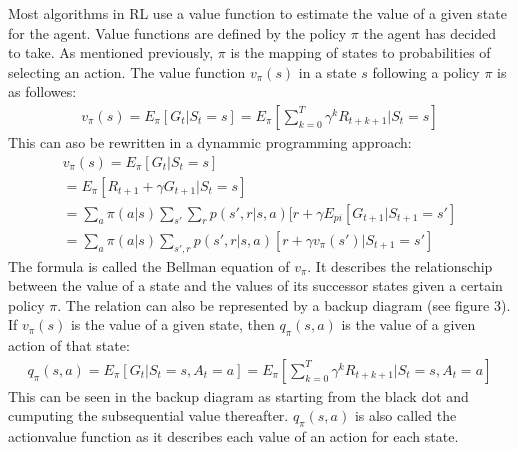 \documentclass[letterpaper,10pt,english]{jupyterBook}
\begin{document}
\sphinxAtStartPar
Most algorithms in RL use a value function to estimate the value of a given state for the agent. Value functions are defined by the policy \(\pi\) the agent has decided to take. As mentioned previously, \(\pi\) is the mapping of states to probabilities of selecting an action. The value function \(v_{\pi}(s)\) in a state \(s\) following a policy \(\pi\) is as followes:
\begin{equation*}
\begin{split} v_{\pi}(s) = E_{\pi}[G_t | S_t = s] = E_{\pi}[\sum_{k=0}^T \gamma^kR_{t+k+1} | S_t=s] \end{split}
\end{equation*}
\sphinxAtStartPar
This can aso be rewritten in a dynammic programming approach:
\begin{equation}\label{equation:Reinforcement_learning:my_label}
\begin{split}v_{\pi}(s) = E_{\pi}[G_t | S_t = s] \\
= E_{\pi}[R_{t+1} + \gamma G_{t+1} | S_t = s] \\
= \sum_a \pi(a|s) \sum_{s'} \sum_r p(s', r|s,a)[r + \gamma E_{pi}[G_{t+1} | S_{t+1} = s'] \\
= \sum_a \pi(a|s) \sum_{s', r}p(s', r|s,a)[r + \gamma v_{\pi}(s')| S_{t+1} = s'] \end{split}
\end{equation}
\sphinxAtStartPar
The formula is called the Bellman equation of \(v_{\pi}\). It describes the relationschip between the value of a state and the values of its successor states given a certain policy \(\pi\). The relation can also be represented by a backup diagram (see figure 3). If \(v_{\pi}(s)\) is the value of a given state, then \(q_{\pi}(s,a)\) is the value of a given action of that state:
\begin{equation*}
\begin{split} q_{\pi}(s,a) = E_{\pi}[G_t | S_t = s, A_t = a] = E_{\pi}[\sum_{k=0}^T \gamma^kR_{t+k+1} | S_t=s, A_t = a] \end{split}
\end{equation*}
\sphinxAtStartPar
This can be seen in the backup diagram as starting from the black dot and cumputing the subsequential value thereafter. \(q_{\pi}(s,a)\) is also called the action\sphinxhyphen{}value function as it describes each value of an action for each state.

\sphinxAtStartPar
{}
\end{document}
